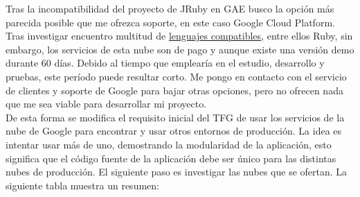 Tras la incompatibilidad del proyecto de JRuby en GAE busco la opción más parecida posible que me ofrezca soporte, en este caso Google Cloud Platform. Tras investigar encuentro multitud de \href{https://cloud.google.com/launcher/explore}{lenguajes compatibles}, entre ellos Ruby, sin embargo, los servicios de esta nube son de pago y aunque existe una versión demo durante 60 días. Debido al tiempo que emplearía en el estudio, desarrollo y pruebas, este período puede resultar corto. Me pongo en contacto con el servicio de clientes y soporte de Google para bajar otras opciones, pero no ofrecen nada que me sea viable para desarrollar mi proyecto.\\

De esta forma se modifica el requisito inicial del TFG de usar los servicios de la nube de Google para encontrar y usar otros entornos de producción. La idea es intentar usar más de uno, demostrando la modularidad de la aplicación, esto significa que el código fuente de la aplicación debe ser único para las distintas nubes de producción. El siguiente paso es investigar las nubes que se ofertan. La siguiente tabla muestra un resumen:

